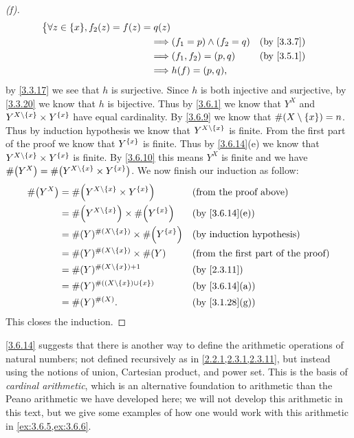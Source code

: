 \begin{proof}[(f)]
\begin{align*}
\begin{dcases}
			           \forall z \in \set{x}, f_2(z) = f(z) = q(z)
		           \end{dcases}                    \\
		\implies & (f_1 = p) \land (f_2 = q)                                  &  & \by{3.3.7} \\
		\implies & (f_1, f_2) = (p, q)                                        &  & \by{3.5.1} \\
		\implies & h(f) = (p, q),
	\end{align*}
	by \cref{3.3.17} we see that \(h\) is surjective.
	Since \(h\) is both injective and surjective, by \cref{3.3.20} we know that \(h\) is bijective.
	Thus by \cref{3.6.1} we know that \(Y^X\) and \(Y^{X \setminus \left\lbrace x\right\rbrace} \times Y^{\left\lbrace x\right\rbrace}\) have equal cardinality.
	By \cref{3.6.9} we know that \(\#(X \setminus \left\lbrace x\right\rbrace) = n\).
	Thus by induction hypothesis we know that \(Y^{X \setminus \left\lbrace x\right\rbrace}\) is finite.
	From the first part of the proof we know that \(Y^{\left\lbrace x\right\rbrace}\) is finite.
	Thus by \cref{3.6.14}(e) we know that \(Y^{X \setminus \left\lbrace x\right\rbrace} \times Y^{\left\lbrace x\right\rbrace}\) is finite.
	By \cref{3.6.10} this means \(Y^X\) is finite and we have \(\#\pa{Y^X} = \#\pa{Y^{X \setminus \set{x}} \times Y^{\set{x}}}\).
	We now finish our induction as follow:
	\begin{align*}
		\#\pa{Y^X} & = \#\pa{Y^{X \setminus \set{x}} \times Y^{\set{x}}}         &  & \text{(from the proof above)}             \\
		           & = \#\pa{Y^{X \setminus \set{x}}} \times \#\pa{Y^{\set{x}}}  &  & \by{3.6.14}[e]                            \\
		           & = \#(Y)^{\#(X \setminus \set{x})} \times \#\pa{Y^{\set{x}}} &  & \byIH                                     \\
		           & = \#(Y)^{\#(X \setminus \set{x})} \times \#(Y)              &  & \text{(from the first part of the proof)} \\
		           & = \#(Y)^{\#(X \setminus \set{x}) + 1}                       &  & \by{2.3.11}                               \\
		           & = \#(Y)^{\#((X \setminus \set{x}) \cup \set{x})}            &  & \by{3.6.14}[a]                            \\
		           & = \#(Y)^{\#(X)}.                                            &  & \by{3.1.28}[g]
	\end{align*}
	This closes the induction.
\end{proof}

\begin{rmk}\label{3.6.15}
	\cref{3.6.14} suggests that there is another way to define the arithmetic operations of natural numbers;
	not defined recursively as in \cref{2.2.1,2.3.1,2.3.11}, but instead using the notions of union, Cartesian product, and power set.
	This is the basis of \emph{cardinal arithmetic}, which is an alternative foundation to arithmetic than the Peano arithmetic we have developed here;
	we will not develop this arithmetic in this text, but we give some examples of how one would work with this arithmetic in \cref{ex:3.6.5,ex:3.6.6}.
\end{rmk}

